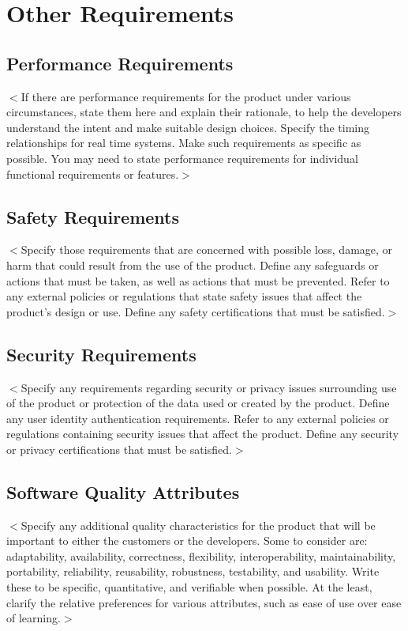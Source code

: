 \documentclass{scrreprt}
\begin{document}
\chapter{Other Requirements}

\section{Performance Requirements}
$<$If there are performance requirements for the product under various 
circumstances, state them here and explain their rationale, to help the 
developers understand the intent and make suitable design choices. Specify the 
timing relationships for real time systems. Make such requirements as specific 
as possible. You may need to state performance requirements for individual 
functional requirements or features.$>$

\section{Safety Requirements}
$<$Specify those requirements that are concerned with possible loss, damage, or 
harm that could result from the use of the product. Define any safeguards or 
actions that must be taken, as well as actions that must be prevented. Refer to 
any external policies or regulations that state safety issues that affect the 
product’s design or use. Define any safety certifications that must be 
satisfied.$>$

\section{Security Requirements}
$<$Specify any requirements regarding security or privacy issues surrounding use 
of the product or protection of the data used or created by the product. Define 
any user identity authentication requirements. Refer to any external policies or 
regulations containing security issues that affect the product. Define any 
security or privacy certifications that must be satisfied.$>$

\section{Software Quality Attributes}
$<$Specify any additional quality characteristics for the product that will be 
important to either the customers or the developers. Some to consider are: 
adaptability, availability, correctness, flexibility, interoperability, 
maintainability, portability, reliability, reusability, robustness, testability, 
and usability. Write these to be specific, quantitative, and verifiable when 
possible. At the least, clarify the relative preferences for various attributes, 
such as ease of use over ease of learning.$>$
\end{document}
